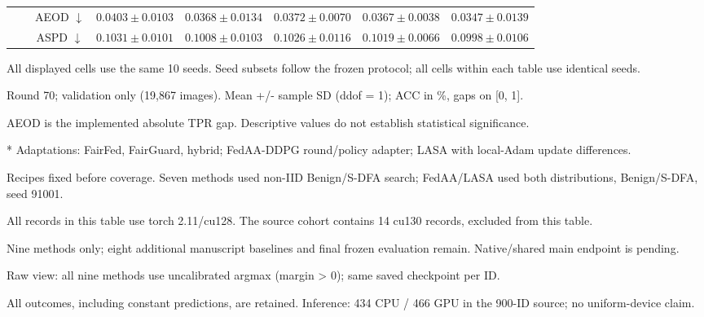 \begin{table}[t]
{\begin{tabular}{l|l|c|ccccc}
 &  & AEOD $\downarrow$ & $0.0403 \pm 0.0103$ & $0.0368 \pm 0.0134$ & $0.0372 \pm 0.0070$ & $0.0367 \pm 0.0038$ & $0.0347 \pm 0.0139$ \\
 &  & ASPD $\downarrow$ & $0.1031 \pm 0.0101$ & $0.1008 \pm 0.0103$ & $0.1026 \pm 0.0116$ & $0.1019 \pm 0.0066$ & $0.0998 \pm 0.0106$ \\
\hline\hline
\end{tabular}}
\par\smallskip
\begin{minipage}{\textwidth}\scriptsize
All displayed cells use the same 10 seeds. Seed subsets follow the frozen protocol; all cells within each table use identical seeds.\par
Round 70; validation only (19,867 images). Mean +/- sample SD (ddof = 1); ACC in \%, gaps on [0, 1].\par
AEOD is the implemented absolute TPR gap. Descriptive values do not establish statistical significance.\par
* Adaptations: FairFed, FairGuard, hybrid; FedAA-DDPG round/policy adapter; LASA with local-Adam update differences.\par
Recipes fixed before coverage. Seven methods used non-IID Benign/S-DFA search; FedAA/LASA used both distributions, Benign/S-DFA, seed 91001.\par
All records in this table use torch 2.11/cu128. The source cohort contains 14 cu130 records, excluded from this table.\par
Nine methods only; eight additional manuscript baselines and final frozen evaluation remain. Native/shared main endpoint is pending.\par
Raw view: all nine methods use uncalibrated argmax (margin > 0); same saved checkpoint per ID.\par
All outcomes, including constant predictions, are retained. Inference: 434 CPU / 466 GPU in the 900-ID source; no uniform-device claim.\par
\end{minipage}
\end{table}
